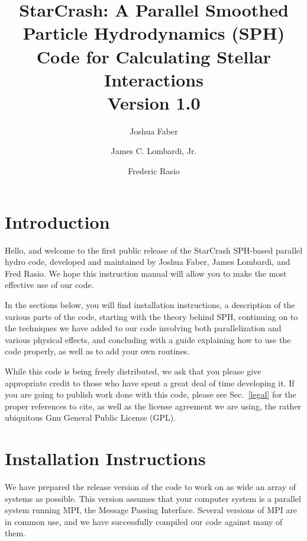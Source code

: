 


\title{StarCrash: A Parallel Smoothed Particle Hydrodynamics (SPH) Code for Calculating Stellar Interactions\\
\vspace{0.5cm}Version 1.0}
\author{Joshua Faber}
\author{James C. Lombardi, Jr.}
\author{Frederic Rasio}
\newpage
\tableofcontents

\newpage
\section{Introduction}
Hello, and welcome to the first public release of the StarCrash SPH-based
parallel hydro code, developed and maintained by Joshua Faber, James Lombardi, and Fred
Rasio.  We hope this instruction
manual will allow you to make the most effective use of our code.   

In the sections below, you will find installation instructions, 
a description of the various
parts of the code, starting with the theory behind SPH, continuing on
to the techniques we have added to our code involving both
parallelization and various physical effects, and concluding
with a guide explaining how to use the code properly, as well
as to add your own routines. 

While this code is being freely distributed, we ask that you please
give appropriate credit to those who have spent a great deal of time
developing it.  If you are going to publish work done with this
code, please see Sec.~\ref{legal} for the proper references to cite, as
well as the license agreement we are using, the rather ubiquitous Gnu
General Public License (GPL). 

\newpage
\section{Installation Instructions}
\label{ii}
We have prepared the release version of the code to work on as wide an
array of systems as possible.  This version assumes that your computer
system is a parallel system running MPI, the Message Passing
Interface.  Several versions of MPI are in common use, and we have
successfully compiled our code against many of them. 

